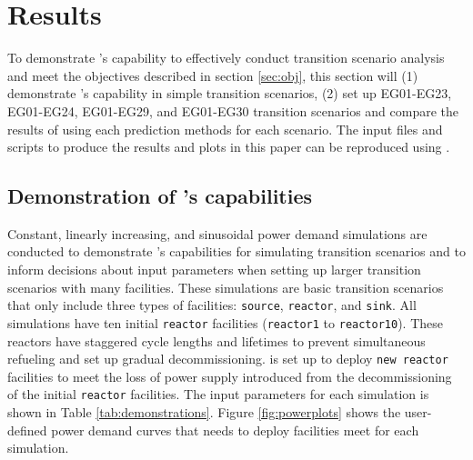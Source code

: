 \section{Results}
To demonstrate \deploy's capability to effectively conduct transition
scenario analysis and meet the objectives described in section 
\ref{sec:obj}, this section will (1) demonstrate 
\deploy's capability in simple transition scenarios, (2) set up 
EG01-EG23, EG01-EG24, EG01-EG29, and EG01-EG30 transition scenarios
and compare the results of using each prediction methods for each 
scenario. 
The input files and scripts to produce the results and plots in this
paper can be reproduced using \cite{d3ploy_doi_2019}. 

\subsection{Demonstration of \deploy's capabilities}
\label{sec:demo}
Constant, linearly increasing, and sinusoidal power demand simulations 
are conducted to demonstrate \deploy's capabilities for 
simulating transition scenarios and to inform decisions about 
input parameters when setting up larger transition scenarios 
with many facilities.  
These simulations are basic transition scenarios that only include 
three types of facilities: \texttt{source}, \texttt{reactor}, and 
\texttt{sink}. 
All simulations have ten initial \texttt{reactor} facilities 
(\texttt{reactor1} to \texttt{reactor10}). 
These reactors have staggered cycle lengths and lifetimes to prevent 
simultaneous refueling and set up gradual decommissioning. 
\Deploy is set up to deploy \texttt{new reactor} facilities
to meet the loss of power supply introduced from the decommissioning 
of the initial \texttt{reactor} facilities. 
The \deploy input parameters for each simulation is shown in Table 
\ref{tab:demonstrations}. 
Figure \ref{fig:powerplots} shows the user-defined power demand curves 
that \deploy needs to deploy facilities meet for each simulation.

